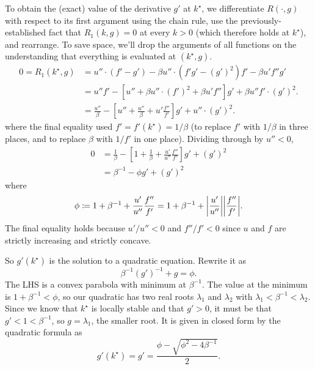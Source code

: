 \documentclass[11pt,letterpaper,reqno,oneside]{article}
\begin{document}
To obtain the (exact) value of the derivative $g'$ at $k^\star$, we differentiate $R(\cdot,g)$ with respect to its first argument using the chain rule, use the previously-established fact that $R_1(k,g) = 0$ at every $k>0$ (which therefore holds at $k^\star$), and rearrange. To save space, we'll drop the arguments of all functions on the understanding that everything is evaluated at $(k^\star,g)$.
%
\begin{align*}
	0 = R_1(k^\star,g)
	&=
	u'' \cdot \left( f' - g' \right) 
	- \beta u'' \cdot \left( f' g' - \left(g'\right)^2 \right) f' 
	- \beta u' f'' g' 
	\\
	&= u'' f' 
	- \left[ u'' + \beta u'' \cdot \left(f'\right)^2 + \beta u' f'' \right] g' 
	+ \beta u'' f' \cdot \left(g'\right)^2 .
	\\
	&= \frac{u''}{\beta} 
	- \left[ u'' + \frac{u''}{\beta} + u' \frac{f''}{f'} \right] g' 
	+ u'' \cdot \left(g'\right)^2 .
\end{align*}
%
where the final equality used $f' = f'(k^\star) = 1/\beta$ (to replace $f'$ with $1/\beta$ in three places, and to replace $\beta$ with $1/f'$ in one place). Dividing through by $u''<0$,
%
\begin{align*}
	0 
	&= \frac{1}{\beta} 
	- \left[ 1 + \frac{1}{\beta} + \frac{u'}{u''} \frac{f''}{f'} \right] g' 
	+ \left(g'\right)^2 
	\\
	&= \beta^{-1}
	- \phi g' 
	+ \left(g'\right)^2 
\end{align*}
%
where
%
\begin{equation*}
	\phi 
	\coloneqq 1 + \beta^{-1} + \frac{u'}{u''} \frac{f''}{f'} 
	= 1 + \beta^{-1} + 
	\abs*{\frac{u'}{u''}}
	\abs*{\frac{f''}{f'}} .
\end{equation*}
%
The final equality holds because $u'/u'' < 0$ and $f''/f' < 0$ since $u$ and $f$ are strictly increasing and strictly concave.

So $g'(k^\star)$ is the solution to a quadratic equation. Rewrite it as
%
\begin{equation*}
	\beta^{-1} \left(g'\right)^{-1} + g = \phi .
\end{equation*}
%
The LHS is a convex parabola with minimum at $\beta^{-1}$. The value at the minimum is $1 + \beta^{-1} < \phi$, so our quadratic has two real roots $\lambda_1$ and $\lambda_2$ with $\lambda_1 < \beta^{-1} < \lambda_2$. Since we know that $k^\star$ is locally stable and that $g'>0$, it must be that $g' < 1 < \beta^{-1}$, so $g = \lambda_1$, the smaller root. It is given in closed form by the quadratic formula as
%
\begin{equation*}
	g'(k^\star) = g' 
	= \frac{ \phi - \sqrt{ \phi^2 - 4 \beta^{-1} } }{ 2 } .
\end{equation*}
\end{document}
